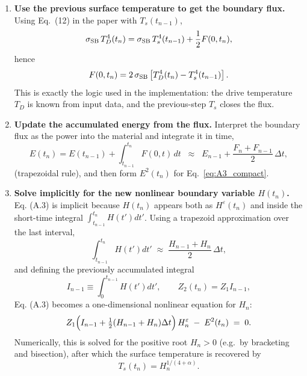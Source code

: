 \documentclass{article}
\begin{document}
\begin{enumerate}
    \item \textbf{Use the previous surface temperature to get the boundary flux.}
    Using Eq.~(12) in the paper with $T_s(t_{n-1})$,
    \begin{equation}
    \sigma_{\rm SB}\,T_D^4(t_n)
    =
    \sigma_{\rm SB}\,T_s^4(t_{n-1}) + \frac{1}{2}F(0,t_n),
    \end{equation}
    hence
    \begin{equation}
    F(0,t_n) = 2\,\sigma_{\rm SB}\left[T_D^4(t_n)-T_s^4(t_{n-1})\right].
    \label{eq:flux_update}
    \end{equation}
    This is exactly the logic used in the implementation: the drive temperature $T_D$ is known from input data, and the previous-step $T_s$ closes the flux.

    \item \textbf{Update the accumulated energy from the flux.}
    Interpret the boundary flux as the power into the material and integrate it in time,
    \begin{equation}
    E(t_n) = E(t_{n-1}) + \int_{t_{n-1}}^{t_n} F(0,t)\,dt
    \;\;\approx\;\;
    E_{n-1} + \frac{F_n+F_{n-1}}{2}\,\Delta t,
    \label{eq:E_trap}
    \end{equation}
    (trapezoidal rule), and then form $E^2(t_n)$ for Eq.~\eqref{eq:A3_compact}.

    \item \textbf{Solve implicitly for the new nonlinear boundary variable $H(t_n)$.}
    Eq. (A.3) is implicit because $H(t_n)$ appears both as $H^\varepsilon(t_n)$ and inside the short-time integral $\int_{t_{n-1}}^{t_n}H(t')dt'$.
    Using a trapezoid approximation over the last interval,
    \begin{equation}
    \int_{t_{n-1}}^{t_n} H(t')dt' \;\approx\; \frac{H_{n-1}+H_n}{2}\,\Delta t,
    \label{eq:I_last_trap}
    \end{equation}
    and defining the previously accumulated integral
    \begin{equation}
    I_{n-1}\equiv \int_0^{t_{n-1}} H(t')dt',
    \qquad
    Z_2(t_n)=Z_1 I_{n-1},
    \end{equation}
    Eq. (A.3) becomes a one-dimensional nonlinear equation for $H_n$:
    \begin{equation}
    Z_1\Bigl(I_{n-1}+\tfrac{1}{2}(H_{n-1}+H_n)\Delta t\Bigr)\,H_n^{\varepsilon}
    \;-\;
    E^2(t_n)
    \;=\;0.
    \label{eq:implicit_H_equation}
    \end{equation}
    Numerically, this is solved for the positive root $H_n>0$ (e.g.\ by bracketing and bisection), after which the surface temperature is recovered by
    \begin{equation}
    T_s(t_n) = H_n^{1/(4+\alpha)}.
    \end{equation}


\end{enumerate}
\end{document}
